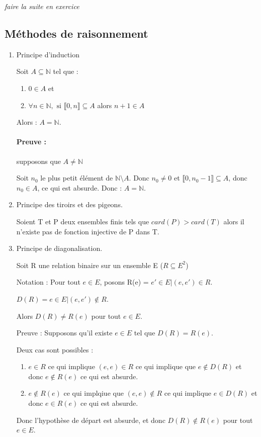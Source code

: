 \documentclass[12pt, a4paper]{report}
\begin{document}
\begin{center}
\textit{faire la suite en exercice}
\end{center}

\subsection{Méthodes de raisonnement}
\begin{enumerate}
\item Principe d'induction

Soit $A\subseteq \mathbb{N}$ tel que :
\begin{enumerate}
\item $0\in A$ et
\item $\forall n \in \mathbb{N}, \text{ si } \llbracket 0,n\rrbracket \subseteq A$ alors $n+1\in A$
\end{enumerate}
Alors : $A=\mathbb{N}$.
\paragraph{Preuve :} supposons que $A\neq \mathbb{N}$

Soit $n_0$ le plus petit élément de $\mathbb{N}\setminus A$. Donc $n_0\neq 0$ et $\llbracket 0,n_0-1\rrbracket \subseteq A$, donc $n_0\in A$, ce qui est absurde. Donc : $A=\mathbb{N}$.







\item Principe des tiroirs et des pigeons. 

Soient T et P deux ensembles finis tels que $card(P) > card(T)$  alors il n'existe pas de fonction injective de P dans T.


\item Principe de diagonalisation.

Soit R une relation binaire sur un ensemble E ($R \subseteq E^2$)

Notation : Pour tout $e \in E$, posons R(e) = ${e' \in E | (e, e') \in R}$.

$D(R) = {e \in E | (e, e') \not\in R}$.

Alors $D(R) \neq R(e)$ pour tout $e\in E$.

Preuve : Supposons qu'il existe $e \in E$ tel que $ D(R) = R(e)$.

Deux cas sont possibles :
\begin{enumerate}
\item $e \in R$ ce qui implique $(e, e) \in R$ ce qui implique que $e \not\in D(R)$ et donc $e \not\in R(e)$ ce qui est absurde.

\item $e \not\in R(e)$ ce qui implqiue que $(e,e) \not\in R$ ce qui implique $e \in D(R)$ et donc $e \in R(e)$ ce qui est absurde.

\end{enumerate}

Donc l'hypothèse de départ est absurde, et donc $D(R) \not\in R(e)$ pour tout $e \in E$.
\end{enumerate}
\end{document}
